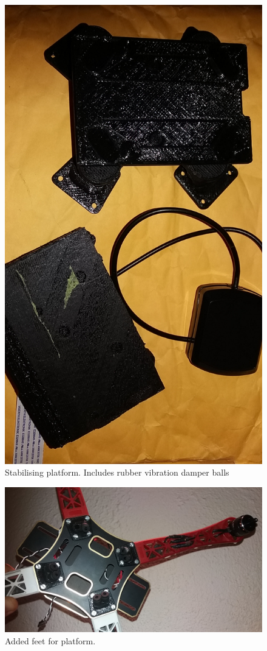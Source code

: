 \begin{figure}
\centering
\includegraphics[scale=0.1]{images/drone-build-3dplatform.jpg}
\caption{Stabilising platform. Includes rubber vibration damper balls}
\label{fig:frame}
\end{figure}

\begin{figure}
\centering
\includegraphics[scale=0.1]{images/drone-build-feet.jpg}
\caption{Added feet for platform.}
\label{fig:frame}
\end{figure}

